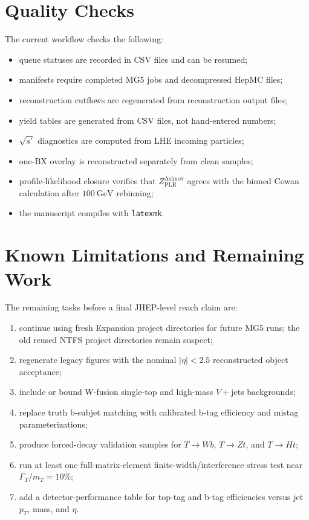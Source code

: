 \documentclass[11pt]{article}
\begin{document}
\section{Quality Checks}

The current workflow checks the following:
\begin{itemize}
  \item queue statuses are recorded in CSV files and can be resumed;
  \item manifests require completed MG5 jobs and decompressed HepMC files;
  \item reconstruction cutflows are regenerated from reconstruction output files;
  \item yield tables are generated from CSV files, not hand-entered numbers;
  \item $\sqrt{s'}$ diagnostics are computed from LHE incoming particles;
  \item one-BX overlay is reconstructed separately from clean samples;
  \item profile-likelihood closure verifies that
        $Z_{\mathrm{PLR}}^{\mathrm{Asimov}}$ agrees with the binned Cowan
        calculation after $100~\mathrm{GeV}$ rebinning;
  \item the manuscript compiles with \texttt{latexmk}.
\end{itemize}

\section{Known Limitations and Remaining Work}
\label{sec:remaining}

The remaining tasks before a final JHEP-level reach claim are:
\begin{enumerate}
  \item continue using fresh Expansion project directories for future MG5 runs;
        the old reused NTFS project directories remain suspect;
  \item regenerate legacy figures with the nominal $|\eta|<2.5$ reconstructed
        object acceptance;
  \item include or bound W-fusion single-top and high-mass $V+$jets backgrounds;
  \item replace truth b-subjet matching with calibrated b-tag efficiency and
        mistag parameterizations;
  \item produce forced-decay validation samples for
        $T\to Wb$, $T\to Zt$, and $T\to Ht$;
  \item run at least one full-matrix-element finite-width/interference stress
        test near $\Gamma_T/m_T=10\%$;
  \item add a detector-performance table for top-tag and b-tag efficiencies
        versus jet $p_T$, mass, and $\eta$.
\end{enumerate}
\end{document}
